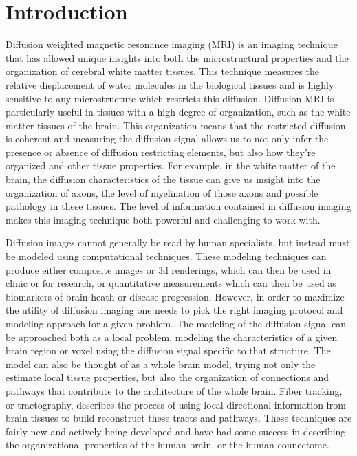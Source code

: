 \chapter{Introduction}

Diffusion weighted magnetic resonance imaging (MRI) is an imaging technique that has allowed unique insights into both the microstructural properties and the organization of cerebral white matter tissues. This technique measures the relative displacement of water molecules in the biological tissues and is highly sensitive to any microstructure which restricts this diffusion. Diffusion MRI is particularly useful in tissues with a high degree of organization, such as the white matter tissues of the brain. This organization means that the restricted diffusion is coherent and measuring the diffusion signal allows us to not only infer the presence or absence of diffusion restricting elements, but also how they're organized and other tissue properties. For example, in the white matter of the brain, the diffusion characteristics of the tissue can give us insight into the organization of axons, the level of myelination of those axons and possible pathology in these tissues. The level of information contained in diffusion imaging makes this imaging technique both powerful and challenging to work with.
	
Diffusion images cannot generally be read by human specialists, but instead must be modeled using computational techniques. These modeling techniques can produce either composite images or 3d renderings, which can then be used in clinic or for research, or quantitative measurements which can then be used as biomarkers of brain heath or disease progression. However, in order to maximize the utility of diffusion imaging one needs to pick the right imaging protocol and modeling approach for a given problem. The modeling of the diffusion signal can be approached both as a local problem, modeling the characteristics of a given brain region or voxel using the diffusion signal specific to that structure. The model can also be thought of as a whole brain model, trying not only the estimate local tissue properties, but also the organization of connections and pathways that contribute to the architecture of the whole brain. Fiber tracking, or tractography, describes the process of using local directional information from brain tissues to build reconstruct these tracts and pathways. These techniques are fairly new and actively being developed and have had some success in describing the organizational properties of the human brain, or the human connectome.

